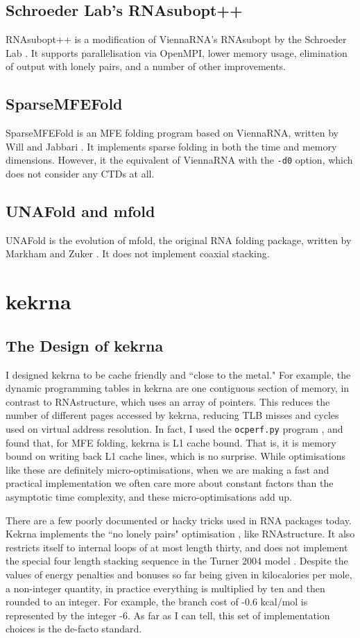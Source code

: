 \documentclass{cshonours}
\def\km{kcal/mol }
\begin{document}
\section{Schroeder Lab's RNAsubopt++}
RNAsubopt++ is a modification of ViennaRNA's RNAsubopt by the Schroeder Lab \cite{sjsVienna}. It supports parallelisation via OpenMPI, lower memory usage, elimination of output with lonely pairs, and a number of other improvements.

\section{SparseMFEFold}
SparseMFEFold is an MFE folding program based on ViennaRNA, written by Will and Jabbari \cite{willSparseFolding}. It implements sparse folding in both the time and memory dimensions. However, it the equivalent of ViennaRNA with the \texttt{-d0} option, which does not consider any CTDs at all.

\section{UNAFold and mfold}
UNAFold is the evolution of mfold, the original RNA folding package, written by Markham and Zuker \cite{unafold}. It does not implement coaxial stacking.

\chapter{kekrna}
\section{The Design of kekrna}
I designed kekrna to be cache friendly and ``close to the metal." For example, the dynamic programming tables in kekrna are one contiguous section of memory, in contrast to RNAstructure, which uses an array of pointers. This reduces the number of different pages accessed by kekrna, reducing TLB misses and cycles used on virtual address resolution. In fact, I used the \texttt{ocperf.py} program \cite{ocperf}, and found that, for MFE folding, kekrna is L1 cache bound. That is, it is memory bound on writing back L1 cache lines, which is no surprise. While optimisations like these are definitely micro-optimisations, when we are making a fast and practical implementation we often care more about constant factors than the asymptotic time complexity, and these micro-optimisations add up.

There are a few poorly documented or hacky tricks used in RNA packages today. Kekrna implements the ``no lonely pairs" optimisation \cite{mathewsLonely}, like RNAstructure. It also restricts itself to internal loops of at most length thirty, and does not implement the special four length stacking sequence in the Turner 2004 model \cite{tNndb}. Despite the values of energy penalties and bonuses so far being given in kilocalories per mole, a non-integer quantity, in practice everything is multiplied by ten and then rounded to an integer. For example, the branch cost of -0.6 \km is represented by the integer -6. As far as I can tell, this set of implementation choices is the de-facto standard.
\end{document}
